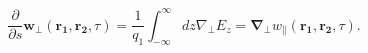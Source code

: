 \begin{equation}
\frac{\partial}{\partial s}\mathbf{w}_{\perp} \left(\mathbf{r_{1}}, \mathbf{r_{2}}, \tau   \right) =  \frac{1}{q_{1}} \int^{\infty}_{-\infty} dz \nabla_{\perp}E_{z} = \mathbf{\nabla_{\perp}} w_{\parallel}\left( \mathbf{r_{1}}, \mathbf{r_{2}}, \tau   \right).
\end{equation}


